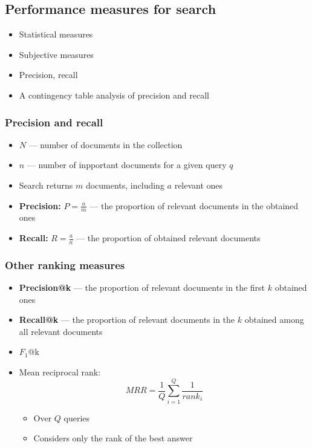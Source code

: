 \documentclass{article}
\begin{document}
    \subsection{Performance measures for search}
    \begin{itemize}
        \item Statistical measures
        \item Subjective measures
        \item Precision, recall
        \item A contingency table analysis of precision and recall
    \end{itemize}

        \subsubsection{Precision and recall}
        \begin{itemize}
            \item $N$ --- number of documents in the collection
            \item $n$ --- number of inpportant documents for a given query $q$
            \item Search returns $m$ documents, including $a$ relevant ones
            \item \textbf{Precision:} $P = \frac{a}{m}$ --- the proportion of relevant documents in the obtained ones
            \item \textbf{Recall:} $R = \frac{a}{n}$ --- the proportion of obtained relevant documents
        \end{itemize}

        \subsubsection{Other ranking measures}
        \begin{itemize}
            \item \textbf{Precision@k} --- the proportion of relevant documents in the first $k$ obtained ones
            \item \textbf{Recall@k} --- the proportion of relevant documents in the $k$ obtained among all relevant documents
            \item $F_{1}$@k
            \item Mean reciprocal rank:
            \[ MRR = \frac{1}{Q} \sum_{i=1}^{Q} \frac{1}{rank_i} \]
            \begin{itemize}
                \item Over $Q$ queries
                \item Considers only the rank of the best answer
            \end{itemize}
        \end{itemize}
\end{document}
